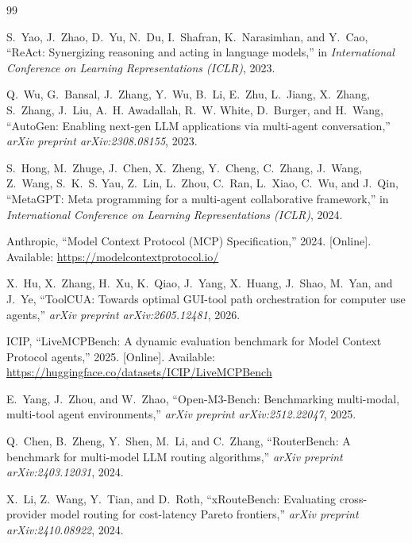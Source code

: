 \documentclass[12pt,a4paper]{report}
\begin{document}
\begin{thebibliography}{99}

S.~Yao, J.~Zhao, D.~Yu, N.~Du, I.~Shafran, K.~Narasimhan, and Y.~Cao, ``ReAct: Synergizing reasoning and acting in language models,'' in \emph{International Conference on Learning Representations (ICLR)}, 2023.

Q.~Wu, G.~Bansal, J.~Zhang, Y.~Wu, B.~Li, E.~Zhu, L.~Jiang, X.~Zhang, S.~Zhang, J.~Liu, A.~H. Awadallah, R.~W. White, D.~Burger, and H.~Wang, ``AutoGen: Enabling next-gen LLM applications via multi-agent conversation,'' \emph{arXiv preprint arXiv:2308.08155}, 2023.

S.~Hong, M.~Zhuge, J.~Chen, X.~Zheng, Y.~Cheng, C.~Zhang, J.~Wang, Z.~Wang, S.~K.~S. Yau, Z.~Lin, L.~Zhou, C.~Ran, L.~Xiao, C.~Wu, and J.~Qin, ``MetaGPT: Meta programming for a multi-agent collaborative framework,'' in \emph{International Conference on Learning Representations (ICLR)}, 2024.

Anthropic, ``Model Context Protocol (MCP) Specification,'' 2024. [Online]. Available: \url{https://modelcontextprotocol.io/}

X.~Hu, X.~Zhang, H.~Xu, K.~Qiao, J.~Yang, X.~Huang, J.~Shao, M.~Yan, and J.~Ye, ``ToolCUA: Towards optimal GUI-tool path orchestration for computer use agents,'' \emph{arXiv preprint arXiv:2605.12481}, 2026.

ICIP, ``LiveMCPBench: A dynamic evaluation benchmark for Model Context Protocol agents,'' 2025. [Online]. Available: \url{https://huggingface.co/datasets/ICIP/LiveMCPBench}

E.~Yang, J.~Zhou, and W.~Zhao, ``Open-M3-Bench: Benchmarking multi-modal, multi-tool agent environments,'' \emph{arXiv preprint arXiv:2512.22047}, 2025.

Q.~Chen, B.~Zheng, Y.~Shen, M.~Li, and C.~Zhang, ``RouterBench: A benchmark for multi-model LLM routing algorithms,'' \emph{arXiv preprint arXiv:2403.12031}, 2024.

X.~Li, Z.~Wang, Y.~Tian, and D.~Roth, ``xRouteBench: Evaluating cross-provider model routing for cost-latency Pareto frontiers,'' \emph{arXiv preprint arXiv:2410.08922}, 2024.


\end{thebibliography}
\end{document}
